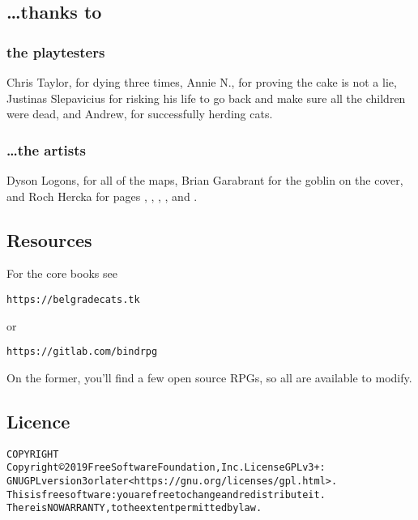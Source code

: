 \vspace{3cm}

\begin{multicols}{2}

\subsection*{\ldots thanks to}
\subsubsection*{the playtesters}
Chris Taylor, for dying three times,
Annie N., for proving the cake is not a lie,
Justinas Slepavicius for risking his life to go back and make sure all the children were dead,
and Andrew, for successfully herding cats.

\subsubsection*{\ldots the artists}

Dyson Logons, for all of the maps,
Brian Garabrant for the goblin on the cover,
and Roch Hercka for pages \pageref{roch:transformation}, \pageref{roch:waking}, \pageref{roch:dragon}, \pageref{roch:garden}, and \pageref{roch:ogres}.

\subsection{Resources}

For the core books see 

\begin{alltt} https://belgradecats.tk \end{alltt} 
or 
\begin{alltt} https://gitlab.com/bindrpg \end{alltt}
On the former, you'll find a few open source RPGs, so all are available to modify.

\end{multicols}

\subsection*{Licence}

\begin{alltt}
COPYRIGHT
       Copyright \copyright 2019 Free Software Foundation, Inc.  License GPLv3+:
	GNU GPL version 3 or later <https://gnu.org/licenses/gpl.html>.
       This is free software: you are free to change and redistribute it.
	There is NO WARRANTY, to the extent permitted by law.

\end{alltt}

